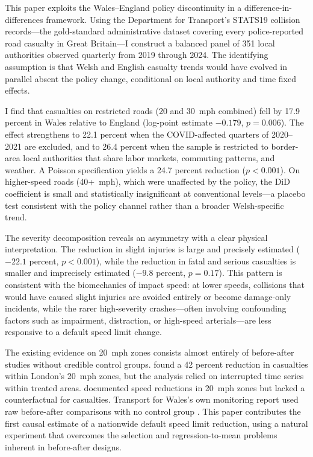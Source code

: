\documentclass[12pt]{article}
\begin{document}
This paper exploits the Wales--England policy discontinuity in a difference-in-differences framework. Using the Department for Transport's STATS19 collision records---the gold-standard administrative dataset covering every police-reported road casualty in Great Britain---I construct a balanced panel of 351 local authorities observed quarterly from 2019 through 2024. The identifying assumption is that Welsh and English casualty trends would have evolved in parallel absent the policy change, conditional on local authority and time fixed effects.

I find that casualties on restricted roads (20 and 30~mph combined) fell by 17.9 percent in Wales relative to England (log-point estimate $-0.179$, $p = 0.006$). The effect strengthens to 22.1 percent when the COVID-affected quarters of 2020--2021 are excluded, and to 26.4 percent when the sample is restricted to border-area local authorities that share labor markets, commuting patterns, and weather. A Poisson specification yields a 24.7 percent reduction ($p < 0.001$). On higher-speed roads (40+~mph), which were unaffected by the policy, the DiD coefficient is small and statistically insignificant at conventional levels---a placebo test consistent with the policy channel rather than a broader Welsh-specific trend.

The severity decomposition reveals an asymmetry with a clear physical interpretation. The reduction in slight injuries is large and precisely estimated ($-22.1$ percent, $p < 0.001$), while the reduction in fatal and serious casualties is smaller and imprecisely estimated ($-9.8$ percent, $p = 0.17$). This pattern is consistent with the biomechanics of impact speed: at lower speeds, collisions that would have caused slight injuries are avoided entirely or become damage-only incidents, while the rarer high-severity crashes---often involving confounding factors such as impairment, distraction, or high-speed arterials---are less responsive to a default speed limit change.

The existing evidence on 20~mph zones consists almost entirely of before-after studies without credible control groups. \citet{grundy2009} found a 42 percent reduction in casualties within London's 20~mph zones, but the analysis relied on interrupted time series within treated areas. \citet{li2012} documented speed reductions in 20~mph zones but lacked a counterfactual for casualties. Transport for Wales's own monitoring report used raw before-after comparisons with no control group \citep{tfw2024}. This paper contributes the first causal estimate of a nationwide default speed limit reduction, using a natural experiment that overcomes the selection and regression-to-mean problems inherent in before-after designs.
\end{document}
